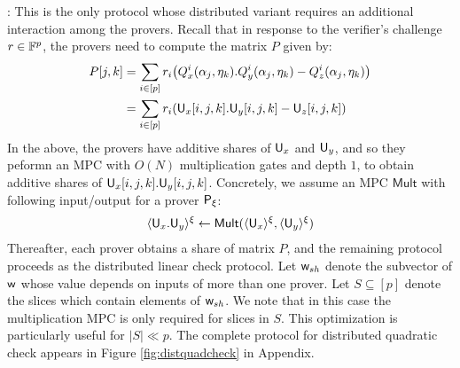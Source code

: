 : This is the only protocol whose distributed variant requires an additional interaction among the provers. Recall that in response to the verifier’s challenge $r\in \mathbb{F}^p$, the provers need to compute the matrix $P$ given by:
\begin{align*}
P[j,k] & =\sum_{i\in
[p]}r_i\big(Q_x^i(\alpha_j,\eta_k).Q_y^i(\alpha_j,\eta_k)-Q_z^i(\alpha_j,\eta_k)\big)\\    
& = \sum_{i\in [p]}r_i(\mathsf{U}_x[i,j,k].\mathsf{U}_y[i,j,k] - \mathsf{U}_z[i,j,k])
\end{align*}    
In the above, the provers have additive shares of $\mathsf{U}_x$ and
$\mathsf{U}_y$, and so they peformn an MPC with $O(N)$ multiplication gates and
depth $1$, to obtain additive shares of $\mathsf{U}_x[i,j,k].\mathsf{U}_y[i,j,k]$.
Concretely, we assume an MPC $\mathsf{Mult}$ with following input/output for
a prover $\mathsf{P}_\xi$:     
\begin{align*}    
\langle{\mathsf{U}_x.\mathsf{U}_y}\rangle^\xi\leftarrow \mathsf{Mult}(\langle{\mathsf{U}_x}\rangle^\xi,\langle{\mathsf{U}_y}\rangle^\xi)    
\end{align*}    
Thereafter, each prover obtains a share of matrix $P$, and the remaining protocol proceeds as
the distributed linear check protocol. Let $\mathsf{w}_{sh}$ denote the subvector of
$\mathsf{w}$ whose value depends on inputs of more than one prover. Let $S\subseteq
[p]$ denote the slices which contain elements of $\mathsf{w}_{sh}$. We note that in
this case the multiplication MPC is only required for slices in $S$. This
optimization is particularly useful for $|S|\ll p$. 
The complete protocol for
distributed quadratic check appears in Figure \ref{fig:distquadcheck} in
Appendix.
